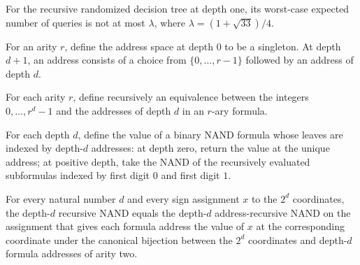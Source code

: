 \begin{theorem}
\label{FABL.exercise8_40g_coefficient_one_fails_at_depth_one}
\leanok
{}
For the recursive randomized decision tree at depth one, its worst-case expected number
of queries is not at most $\lambda$, where $\lambda=(1+\sqrt{33})/4$.
\end{theorem}

\begin{definition}
\label{FABL.FormulaAddress}
\leanok
For an arity $r$, define the address space at depth $0$ to be a singleton. At depth
$d+1$, an address consists of a choice from $\{0,\ldots,r-1\}$ followed by an address of
depth $d$.
\end{definition}

\begin{definition}
\label{FABL.finFormulaAddressEquiv}
\leanok
{}
For each arity $r$, define recursively an equivalence between the integers
$0,\ldots,r^d-1$ and the addresses of depth $d$ in an $r$-ary formula.
\end{definition}

\begin{definition}
\label{FABL.addressRecursiveNAND}
\leanok
{}
For each depth $d$, define the value of a binary NAND formula whose leaves are indexed
by depth-$d$ addresses: at depth zero, return the value at the unique address; at
positive depth, take the NAND of the recursively evaluated subformulas indexed by first
digit $0$ and first digit $1$.
\end{definition}

\begin{theorem}
\label{FABL.recursiveNAND_eq_addressRecursiveNAND}
\leanok
{}
For every natural number $d$ and every sign assignment $x$ to the $2^d$ coordinates, the
depth-$d$ recursive NAND equals the depth-$d$ address-recursive NAND on the assignment
that gives each formula address the value of $x$ at the corresponding coordinate under
the canonical bijection between the $2^d$ coordinates and depth-$d$ formula addresses of
arity two.
\end{theorem}

